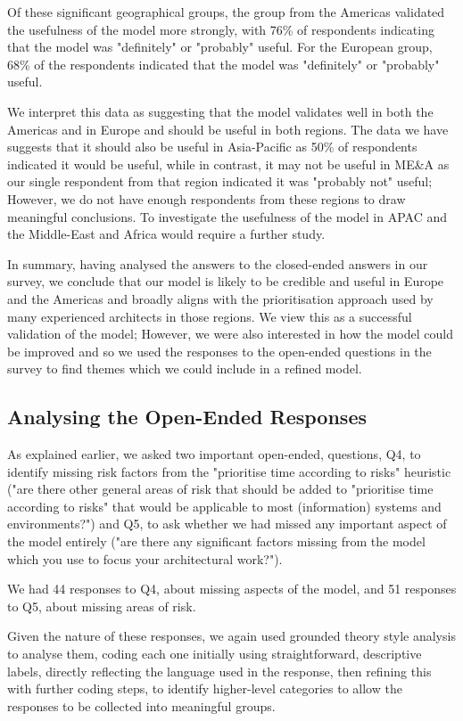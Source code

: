 Of these significant geographical groups, the group from the Americas validated the usefulness of the model more strongly, with 76\% of respondents indicating that the model was "definitely" or "probably" useful.  For the European group, 68\% of the respondents indicated that the model was "definitely" or "probably" useful.

We interpret this data as suggesting that the model validates well in both the Americas and in Europe and should be useful in both regions.  The data we have suggests that it should also be useful in Asia-Pacific as 50\% of respondents indicated it would be useful, while in contrast, it may not be useful in ME\&A as our single respondent from that region indicated it was "probably not" useful; However, we do not have enough respondents from these regions to draw meaningful conclusions.  To investigate the usefulness of the model in APAC and the Middle-East and Africa would require a further study.

In summary, having analysed the answers to the closed-ended answers in our survey, we conclude that our model is likely to be credible and useful in Europe and the Americas and broadly aligns with the prioritisation approach used by many experienced architects in those regions.
We view this as a successful validation of the model; However, we were also interested in how the model could be improved and so we used the responses to the open-ended questions in the survey to find themes which we could include in a refined model.

\subsection{Analysing the Open-Ended Responses}
\label{sec:openended}

As explained earlier, we asked two important open-ended, questions, Q4, to identify missing risk factors from the "prioritise time according to risks" heuristic ("are there other general areas of risk that should be added to "prioritise time according to risks" that would be applicable to most (information) systems and environments?") and Q5, to ask whether we had missed any important aspect of the model entirely ("are there any significant factors missing from the model which you use to focus your architectural work?").

We had 44 responses to Q4, about missing aspects of the model, and 51 responses to Q5, about missing areas of risk.

Given the nature of these responses, we again used grounded theory style analysis to analyse them, coding each one initially using straightforward, descriptive labels, directly reflecting the language used in the response, then refining this with further coding steps, to identify higher-level categories to allow the responses to be collected into meaningful groups.

